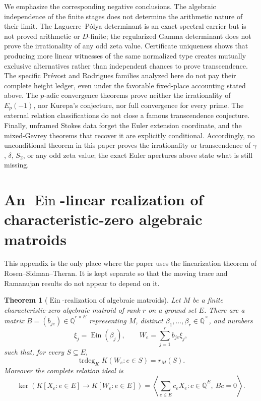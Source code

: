 \documentclass[11pt]{article}
\newtheorem{theorem}{Theorem}[section]
\theoremstyle{definition}
\theoremstyle{remark}
\newcommand{\Qbar}{\overline{\mathbb Q}}
\newcommand{\Ein}{\operatorname{Ein}}
\newcommand{\trdeg}{\operatorname{trdeg}}
\begin{document}
We emphasize the corresponding negative conclusions.  The algebraic independence of the
finite stages does not determine the arithmetic nature of their limit.  The
Laguerre--P\'olya determinant is an exact spectral carrier but is not proved
arithmetic or \(D\)-finite; the regularized Gamma determinant does not prove
the irrationality of any odd zeta value.  Certificate uniqueness shows that producing more
linear witnesses of the same normalized type creates mutually exclusive
alternatives rather than independent chances to prove transcendence.  The
specific Pr\'evost and Rodrigues families analyzed here do not pay their
complete height ledger, even under the favorable fixed-place accounting
stated above.  The \(p\)-adic convergence theorems prove neither the
irrationality of \(E_p(-1)\), nor Kurepa's conjecture, nor full convergence
for every prime.  The external relation classifications do not close a
famous transcendence conjecture.  Finally, unframed Stokes data forget the
Euler extension coordinate, and the mixed-Gevrey theorems that recover it
are explicitly conditional.
Accordingly, no unconditional theorem in this paper proves the irrationality or
transcendence of \(\gamma\), \(\delta\), \(S_2\), or any odd zeta value; the
exact Euler apertures above state what is still missing.

\appendix

\section{An \texorpdfstring{\(\Ein\)}{Ein}-linear realization of
characteristic-zero algebraic matroids}
\label{app:Ein-matroids}

This appendix is the only place where the paper uses the linearization
theorem of Rosen--Sidman--Theran.  It is kept separate so that the moving
trace and Ramanujan results do not appear to depend on it.

\begin{theorem}[\(\Ein\)-realization of algebraic matroids]
\label{thm:matroid-Ein-realization}
Let \(M\) be a finite characteristic-zero algebraic matroid of rank \(r\)
on a ground set \(E\).  There are a matrix
\(B=(b_{je})\in\Qbar^{r\times E}\) representing \(M\), distinct
\(\beta_1,\ldots,\beta_r\in\Qbar^\times\), and numbers
\begin{equation}\label{eq:matroid-Ein-realization}
 \xi_j=\Ein(\beta_j),\qquad
 W_e=\sum_{j=1}^r b_{je}\xi_j,
\end{equation}
such that, for every \(S\subseteq E\),
\begin{equation}\label{eq:matroid-rank-realization}
 \boxed{\displaystyle
 \trdeg_KK(W_e:e\in S)=r_M(S).}
\end{equation}
Moreover the complete relation ideal is
\begin{equation}\label{eq:matroid-linear-ideal}
 \boxed{\displaystyle
 \ker\!\left(K[X_e:e\in E]\longrightarrow K[W_e:e\in E]\right)
 =\left\langle\sum_{e\in E}c_eX_e:
 c\in\Qbar^E,\ Bc=0\right\rangle.}
\end{equation}
\end{theorem}
\end{document}
